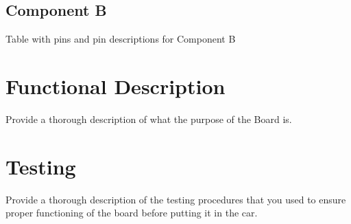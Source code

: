   \subsection{Component B}
  \begin{table}[H]
    \begin{center}
      \caption{Table with pins and pin descriptions for Component B}
      \label{tab:ComponentA}
    \end{center}
  \end{table}

  \section{Functional Description}
  Provide a thorough description of what the purpose of the Board is.

  \section{Testing}
  Provide a thorough description of the testing procedures that you used to ensure proper functioning of the board before putting it in the car.
  
  
  
  
  \begin{versionhistory}
  \end{versionhistory}



